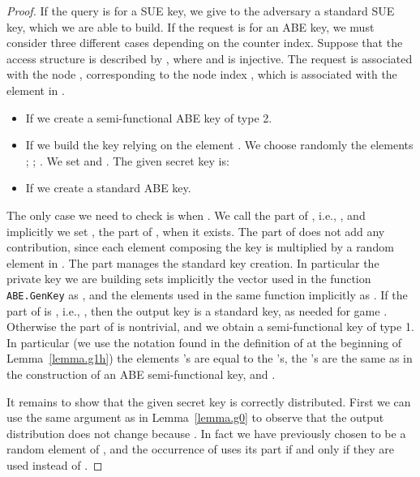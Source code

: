 \documentclass[a4paper,10pt]{article}
\newcommand{\algorithm}[2]{\texttt{#1.#2}}
\newcommand{\randomchoose}[1]{We choose randomly the element\ifstrequal{#1}{s}{}{s} }
\newcommand{\game}[2]{}
\begin{document}
	\begin{proof}
If the query is for a SUE key, we give to the adversary a standard SUE key, which we are able to build. If the request is for an ABE key, we must consider three different cases depending on the counter index. Suppose that the access structure is described by , where  and  is injective. The request is associated with the node , corresponding to the node index , which is associated with the element  in .
		\begin{itemize}
			\item
			If  we create a semi-functional ABE key of type 2.
			\item
			If  we build the key relying on the element .
			\randomchoose{p}{;
				;
				.
			}
			We set  and .			
			The given secret key is:			
			
			\item
			If  we create a standard ABE key.
		\end{itemize}
		The only case we need to check is when .
		We call  the  part of , i.e., , and implicitly we set , the  part of , when it exists.
		The  part of  does not add any contribution, since each element composing the key is multiplied by a random element in .
		The  part manages the standard key creation. In particular the private key we are building sets implicitly the vector  used in the function \algorithm{ABE}{GenKey} as , and the  elements used in the same function implicitly as .
		If the  part of  is , i.e., , then the output key is a standard key, as needed for game \game{H}{k-1,2}.
		Otherwise the  part of  is nontrivial, and we obtain a semi-functional key of type 1. In particular (we use the notation found in the definition of \game{H}{k,1} at the beginning of Lemma~\ref{lemma.g1h}) the elements 's are equal to the 's, the 's are the same as in the construction of an ABE semi-functional key, and .
		
		It remains to show that the given secret key is correctly distributed.
		First we can use the same argument as in Lemma~\ref{lemma.g0} to observe that the output distribution does not change because . In fact we have previously chosen  to be a random element of , and the occurrence of  uses its  part if and only if they are used instead of .
		

\end{proof}
\end{document}
